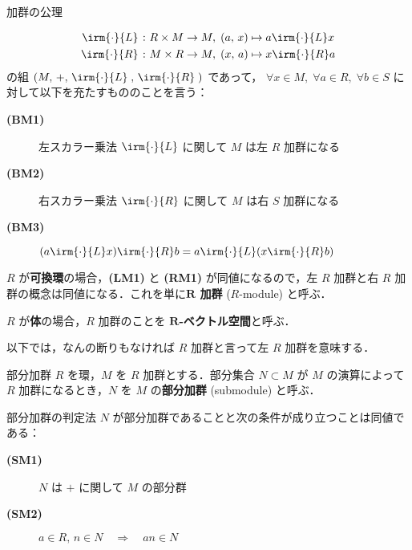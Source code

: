 \documentclass[geometry_main]{subfiles}
\begin{document}
\begin{myaxiom}[label=ax:module,breakable]{加群の公理}
\begin{itemize}
		\begin{align}
			\irm{\cdot}{L} \mathrel{} &\colon R \times M \to M,\; (a,\, x) \mapsto a \irm{\cdot}{L} x \\
			\irm{\cdot}{R} \mathrel{} &\colon M \times R \to M,\; (x,\, a) \mapsto x \irm{\cdot}{R} a
		\end{align}
		の組  $(M,\, +,\, \irm{\cdot}{L}\mathrel{},\, \irm{\cdot}{R}\mathrel{})$ であって， 
		$\forall x\in M,\; \forall a\in R,\; \forall b \in S$ に対して以下を充たすもののことを言う：
		\begin{description}
			\item[\textbf{(BM1)}] 左スカラー乗法 $\irm{\cdot}{L}$ に関して $M$ は左 $R$ 加群になる
			\item[\textbf{(BM2)}] 右スカラー乗法 $\irm{\cdot}{R}$ に関して $M$ は右 $S$ 加群になる
			\item[\textbf{(BM3)}] $(a \irm{\cdot}{L} x) \irm{\cdot}{R} b = a \irm{\cdot}{L} (x \irm{\cdot}{R} b)$
		\end{description}
	\end{itemize}
\end{myaxiom}

$R$ が\textbf{可換環}の場合，\textbf{(LM1)} と \textbf{(RM1)} が同値になるので，左 $R$ 加群と右 $R$ 加群の概念は同値になる．これを単に\textbf{$\bm{R}$ 加群} ($R$-module) と呼ぶ．

$R$ が\textbf{体}の場合，$R$ 加群のことを \textbf{$\bm{R}$-ベクトル空間}と呼ぶ．

\begin{marker}
	以下では，なんの断りもなければ $R$ 加群と言って左 $R$ 加群を意味する．
\end{marker}

\begin{mydef}[label=def:submodule]{部分加群}
	$R$ を環，$M$ を $R$ 加群とする．部分集合 $N \subset M$ が $M$ の演算によって $R$ 加群になるとき，$N$ を $M$ の\textbf{部分加群} (submodule) と呼ぶ．
\end{mydef}

\begin{myprop}[label=prop:submodule]{部分加群の判定法}
	$N$ が部分加群であることと次の条件が成り立つことは同値である：
	\begin{description}
		\item[\textbf{(SM1)}] $N$ は $+$ に関して $M$ の部分群
		\item[\textbf{(SM2)}] $a\in R,\, n \in N\quad \Longrightarrow \quad an \in N$
	\end{description}
\end{myprop}
\end{document}
